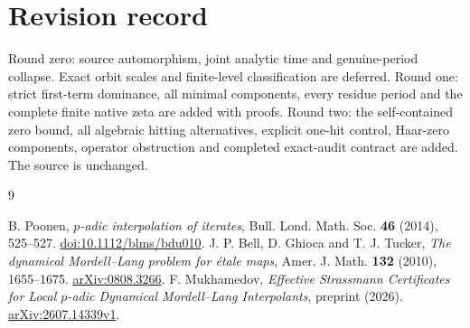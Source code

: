 \documentclass[10pt]{article}
\begin{document}
\section*{Revision record}
\ifcase\CRevisionRound
Round zero: source automorphism, joint analytic time and genuine-period
collapse. Exact orbit scales and finite-level classification are deferred.
\or
Round one: strict first-term dominance, all minimal components, every
residue period and the complete finite native zeta are added with proofs.
\else
Round two: the self-contained zero bound, all algebraic hitting alternatives,
explicit one-hit control, Haar-zero components, operator obstruction and
completed exact-audit contract are added. The source is unchanged.
\fi

\begin{thebibliography}{9}
\raggedright
{} B. Poonen, \emph{$p$-adic interpolation of iterates},
Bull. Lond. Math. Soc. \textbf{46} (2014), 525--527.
\href{https://doi.org/10.1112/blms/bdu010}{doi:10.1112/blms/bdu010}.
 J. P. Bell, D. Ghioca and T. J. Tucker,
\emph{The dynamical Mordell--Lang problem for étale maps},
Amer. J. Math. \textbf{132} (2010), 1655--1675.
\href{https://arxiv.org/abs/0808.3266}{arXiv:0808.3266}.
 F. Mukhamedov,
\emph{Effective Strassmann Certificates for Local $p$-adic Dynamical
Mordell--Lang Interpolants}, preprint (2026).
\href{https://arxiv.org/abs/2607.14339v1}{arXiv:2607.14339v1}.
\end{thebibliography}
\end{document}
